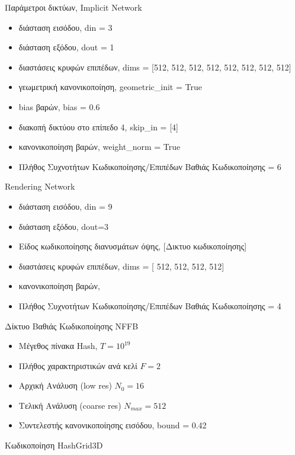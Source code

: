 \begin{appendices}
        Παράμετροι δικτύων, Implicit Network
        \begin{itemize}
            \item διάσταση εισόδου, din = 3
            \item διάσταση εξόδου, dout = 1
            \item διαστάσεις κρυφών επιπέδων, dims = [512, 512, 512, 512, 512, 512, 512, 512]
            \item γεωμετρική κανονικοποίηση, geometric\_init = True
            \item bias βαρών, bias = 0.6
            \item διακοπή δικτύου στο επίπεδο 4, skip\_in = [4]
            \item κανονικοποίηση βαρών, weight\_norm = True
            \item Πλήθος Συχνοτήτων Κωδικοποίησης/Επιπέδων Βαθιάς Κωδικοποίησης = 6
        \end{itemize}
        Rendering Network \\
        \begin{itemize}
            \item διάσταση εισόδου, din = 9
            \item διάσταση εξόδου, dout=3
            \item Είδος κωδικοποίησης διανυσμάτων όψης, [Δικτυο κωδικοποίησης]
            \item  διαστάσεις κρυφών επιπέδων, dims = [ 512, 512, 512, 512]
            \item  κανονικοποίηση βαρών, 
            \item Πλήθος Συχνοτήτων Κωδικοποίησης/Επιπέδων Βαθιάς Κωδικοποίησης = 4
        \end{itemize} 
        Δίκτυο Βαθιάς Κωδικοποίησης NFFB\\ 
        \begin{itemize}
            \item Μέγεθος πίνακα Hash, $T = 10^{19}$
            \item Πλήθος χαρακτηριστικών ανά κελί $F =2$
            \item Αρχική Ανάλυση (low res) $N_0 = 16$
            \item Τελική Ανάλυση (coarse res) $N_{max} = 512$
            \item Συντελεστής κανονικοποίησης εισόδου, bound = 0.42
        \end{itemize}
        Κωδικοποίηση HashGrid3D\\ 
        \begin{itemize}

\end{itemize}
\end{appendices}
